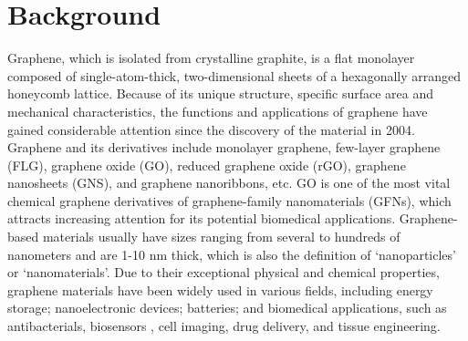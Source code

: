 \documentclass[twoside,twocolumn,9pt]{article}
\begin{document}
\section*{}
\vspace{-1cm}







\section{Background}
Graphene, which is isolated from crystalline graphite, is a flat monolayer composed of single-atom-thick, two-dimensional sheets of a hexagonally arranged honeycomb lattice. Because of its unique structure, specific surface area and mechanical characteristics, the functions and applications of graphene have gained considerable attention since the discovery of the material in 2004. Graphene and its derivatives include monolayer graphene, few-layer graphene (FLG), graphene oxide (GO), reduced graphene oxide (rGO), graphene nanosheets (GNS), and graphene nanoribbons, etc. GO is one of the most vital chemical graphene derivatives of graphene-family nanomaterials (GFNs), which attracts increasing attention for its potential biomedical applications. Graphene-based materials usually have sizes ranging from several to hundreds of nanometers and are 1-10 nm thick, which is also the definition of ‘nanoparticles’ or ‘nanomaterials’. Due to their exceptional physical and chemical properties, graphene materials have been widely used in various fields, including energy storage; nanoelectronic devices; batteries; and biomedical applications, such as antibacterials, biosensors , cell imaging, drug delivery, and tissue engineering.
\end{document}
